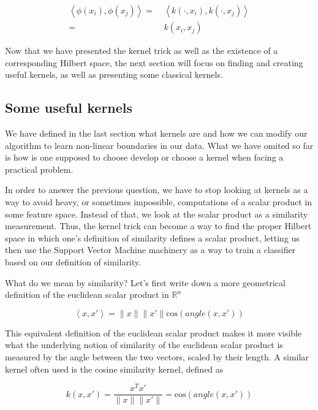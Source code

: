 \begin{equation*}
  \begin{aligned}
    \left<\phi(x_i), \phi(x_j)\right> =\ &\left<k\left(\cdot, x_i\right), k\left(\cdot, x_j\right)\right>\\
    =\ &k(x_i, x_j)
  \end{aligned}
\end{equation*}

Now that we have presented the kernel trick as well as the existence of a corresponding Hilbert space, the next section will focus on finding and creating useful kernels, as well as presenting some classical kernels.

\subsection {Some useful kernels}

We have defined in the last section what kernels are and how we can modify our algorithm to learn non-linear boundaries in our data. What we have omited so far is how is one supposed to choose develop or choose a kernel when facing a practical problem.

In order to answer the previous question, we have to stop looking at kernels as a way to avoid heavy, or sometimes impossible, computations of a scalar product in some feature space. Instead of that, we look at the scalar product as a similarity measurement. Thus, the kernel trick can become a way to find the proper Hilbert space in which one's definition of similarity defines a scalar product, letting us then use the Support Vector Machine machinery as a way to train a classifier based on our definition of similarity.

What do we mean by similarity? Let's first write down a more geometrical  definition of the euclidean scalar product in $\mathbb{R}^n$ 

\begin{equation*}
  \left<x, x'\right> = \|x\|\|x'\|\text{cos}\left(angle\left(x, x'\right)
  \right)
\end{equation*}

This equivalent definition of the euclidean scalar product makes it more visible what the underlying notion of similarity of the euclidean scalar product is measured by the angle between the two vectors, scaled by their length. A similar kernel often used is the cosine similarity kernel, defined as

\begin{equation*}
  k\left(x, x'\right) = \frac{x^Tx'}{\|x\|\|x'\|} = \text{cos}\left(angle\left(x, x'\right)\right)
\end{equation*}

